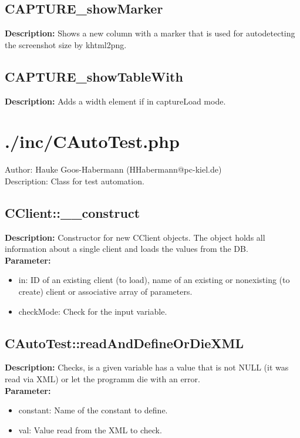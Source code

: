 \subsection{CAPTURE\_showMarker}
\textbf{Description:} Shows a new column with a marker that is used for autodetecting the screenshot size by khtml2png.\\

\subsection{CAPTURE\_showTableWith}
\textbf{Description:} Adds a width element if in captureLoad mode.\\

\newpage\section{./inc/CAutoTest.php}
 Author: Hauke Goos-Habermann (HHabermann@pc-kiel.de)\\
 Description: Class for test automation.\\

\subsection{CClient::\_\_construct}
\textbf{Description:} Constructor for new CClient objects. The object holds all information about a single client and loads the values from the DB.\\
\textbf{Parameter:}
\begin{itemize}
\item in: ID of an existing client (to load), name of an existing or nonexisting (to create) client or associative array of parameters.
\item checkMode: Check for the input variable.
\end{itemize}

\subsection{CAutoTest::readAndDefineOrDieXML}
\textbf{Description:} Checks, is a given variable has a value that is not NULL (it was read via XML) or let the programm die with an error.\\
\textbf{Parameter:}
\begin{itemize}
\item constant: Name of the constant to define.
\item val: Value read from the XML to check.
\end{itemize}

